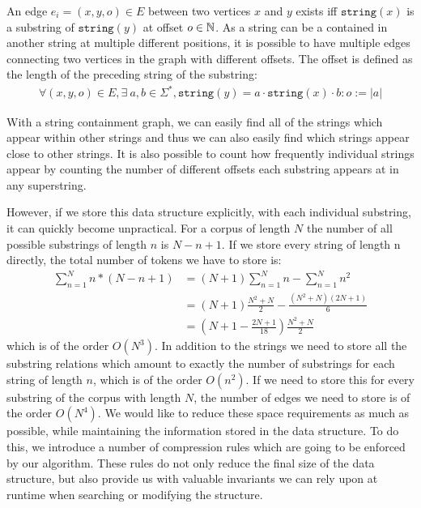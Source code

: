 \noindent
An edge $e_i = (x, y, o) \in E$ between two vertices $x$ and $y$ exists iff $\mathtt{string}(x)$ is a substring of $\mathtt{string}(y)$ at offset $o \in \mathbb{N}$. As a string can be a contained in another string at multiple different positions, it is possible to have multiple edges connecting two vertices in the graph with different offsets. The offset is defined as the length of the preceding string of the substring:
\begin{align*}
    \forall (x, y, o) \in E, \exists \ a, b \in \Sigma^*, \mathtt{string}(y) = a \cdot \mathtt{string}(x) \cdot b: o := |a|
\end{align*}

\noindent With a string containment graph, we can easily find all of the strings which appear within other strings and thus we can also easily find which strings appear close to other strings. It is also possible to count how frequently individual strings appear by counting the number of different offsets each substring appears at in any superstring.

However, if we store this data structure explicitly, with each individual substring, it can quickly become unpractical. For a corpus of length $N$ the number of all possible substrings of length $n$ is $N - n + 1$. If we store every string of length n directly, the total number of tokens we have to store is:
\begin{align*}
    \sum_{n=1}^{N}{n * (N - n + 1)}
    &= (N + 1)\sum_{n=1}^{N}{n} -
    \sum_{n=1}^{N}{n^2}\\
    &= (N + 1)\frac{N^2 + N}{2} - \frac{(N^2 + N)(2N + 1)}{6}\\
    &= (N + 1 - \frac{2N + 1}{18})\frac{N^2 + N}{2}
\end{align*}
which is of the order $O(N^3)$. In addition to the strings we need to store all the substring relations which amount to exactly the number of substrings for each string of length $n$, which is of the order $O(n^2)$. If we need to store this for every substring of the corpus with length $N$, the number of edges we need to store is of the order $O(N^4)$. We would like to reduce these space requirements as much as possible, while maintaining the information stored in the data structure. To do this, we introduce a number of compression rules which are going to be enforced by our algorithm. These rules do not only reduce the final size of the data structure, but also provide us with valuable invariants we can rely upon at runtime when searching or modifying the structure.

